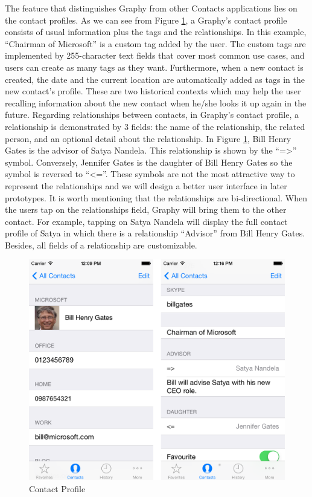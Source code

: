 The feature that distinguishes Graphy from other Contacts applications lies on the contact profiles. As we can see from Figure \ref{fg:contactscreen}, a Graphy's contact profile consists of usual information plus the tags and the relationships. In this example, ``Chairman of Microsoft'' is a custom tag added by the user. The custom tags are implemented by 255-character text fields that cover most common use cases, and users can create as many tags as they want. Furthermore, when a new contact is created, the date and the current location are automatically added as tags in the new contact's profile. These are two historical contexts which may help the user recalling information about the new contact when he/she looks it up again in the future. Regarding relationships between contacts, in Graphy's contact profile, a relationship is demonstrated by 3 fields: the name of the relationship, the related person, and an optional detail about the relationship. In Figure \ref{fg:contactscreen}, Bill Henry Gates is the advisor of Satya Nandela. This relationship is shown by the ``=>'' symbol. Conversely, Jennifer Gates is the daughter of Bill Henry Gates so the symbol is reversed to ``<=''. These symbols are not the most attractive way to represent the relationships and we will design a better user interface in later prototypes. It is worth mentioning that the relationships are bi-directional. When the users tap on the relationships field, Graphy will bring them to the other contact. For example, tapping on Satya Nandela will display the full contact profile of Satya in which there is a relationship ``Advisor'' from Bill Henry Gates. Besides, all fields of a relationship are customizable.

\begin{figure}[!h]
\begin{centering}
\includegraphics[scale=0.3]{pics/contactscreen}
\caption{Contact Profile}\label{fg:contactscreen}
\end{centering}
\end{figure}

